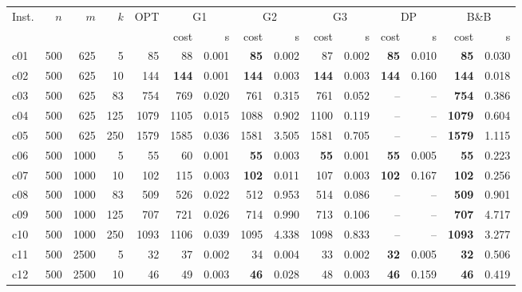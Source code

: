 \begin{longtable}{@{}lrrrr@{\hspace{9pt}}rr@{\hspace{9pt}}rr@{\hspace{9pt}}rr@{\hspace{9pt}}rr@{\hspace{9pt}}rr@{}}\toprule
Inst. & \(n\) & \(m\) & \(k\) & OPT & \multicolumn{2}{c}{G1} & \multicolumn{2}{c}{G2} & \multicolumn{2}{c}{G3} & \multicolumn{2}{c}{DP} & \multicolumn{2}{c}{B\&B}\\
\cmidrule(l{6pt}){6-7}\cmidrule(l{6pt}){8-9}\cmidrule(l{6pt}){10-11}\cmidrule(l{6pt}){12-13}\cmidrule(l{6pt}){14-15}
 & & & & & cost & s & cost & s & cost & s & cost & s & cost & s\\\midrule\endhead
c01 & 500 & 625 & 5 & 85 & 88 & 0.001 & \textbf{85} & 0.002 & 87 & 0.002 & \textbf{85} & 0.010 & \textbf{85} & 0.030\\
c02 & 500 & 625 & 10 & 144 & \textbf{144} & 0.001 & \textbf{144} & 0.003 & \textbf{144} & 0.003 & \textbf{144} & 0.160 & \textbf{144} & 0.018\\
c03 & 500 & 625 & 83 & 754 & 769 & 0.020 & 761 & 0.315 & 761 & 0.052 & -- & -- & \textbf{754} & 0.386\\
c04 & 500 & 625 & 125 & 1079 & 1105 & 0.015 & 1088 & 0.902 & 1100 & 0.119 & -- & -- & \textbf{1079} & 0.604\\
c05 & 500 & 625 & 250 & 1579 & 1585 & 0.036 & 1581 & 3.505 & 1581 & 0.705 & -- & -- & \textbf{1579} & 1.115\\
c06 & 500 & 1000 & 5 & 55 & 60 & 0.001 & \textbf{55} & 0.003 & \textbf{55} & 0.001 & \textbf{55} & 0.005 & \textbf{55} & 0.223\\
c07 & 500 & 1000 & 10 & 102 & 115 & 0.003 & \textbf{102} & 0.011 & 107 & 0.003 & \textbf{102} & 0.167 & \textbf{102} & 0.256\\
c08 & 500 & 1000 & 83 & 509 & 526 & 0.022 & 512 & 0.953 & 514 & 0.086 & -- & -- & \textbf{509} & 0.901\\
c09 & 500 & 1000 & 125 & 707 & 721 & 0.026 & 714 & 0.990 & 713 & 0.106 & -- & -- & \textbf{707} & 4.717\\
c10 & 500 & 1000 & 250 & 1093 & 1106 & 0.039 & 1095 & 4.338 & 1098 & 0.833 & -- & -- & \textbf{1093} & 3.277\\
c11 & 500 & 2500 & 5 & 32 & 37 & 0.002 & 34 & 0.004 & 33 & 0.002 & \textbf{32} & 0.005 & \textbf{32} & 0.506\\
c12 & 500 & 2500 & 10 & 46 & 49 & 0.003 & \textbf{46} & 0.028 & 48 & 0.003 & \textbf{46} & 0.159 & \textbf{46} & 0.419\\

\end{longtable}
